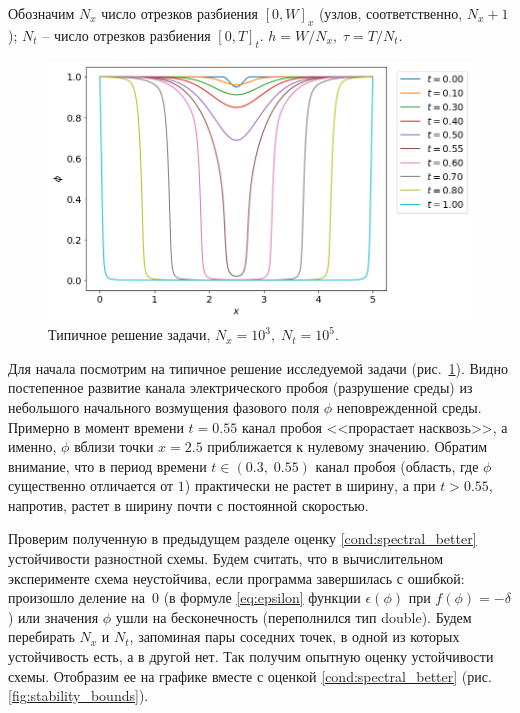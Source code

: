 Обозначим $N_x$ число отрезков разбиения $[0, W]_x$ (узлов, соответственно, $N_x + 1$); $N_t$ -- число отрезков разбиения $[0, T]_t$. $h = W / N_x, \; \tau = T / N_t$.

\begin{figure}[!tp]
	\centering
	\includegraphics[width=\textwidth]{figures/typical_solution.png}
	\vspace{-0.8cm}
	\caption{Типичное решение задачи, $N_x = 10^3, \; N_t = 10^5$.}
	\label{fig:typical_solution}
\end{figure}

Для начала посмотрим на типичное решение исследуемой задачи (рис.~\ref{fig:typical_solution}). Видно постепенное развитие канала электрического пробоя (разрушение среды) из небольшого начального возмущения фазового поля $\phi$ неповрежденной среды. Примерно в момент времени $t = 0.55$ канал пробоя <<прорастает насквозь>>, а именно, $\phi$ вблизи точки $x = 2.5$ приближается к нулевому значению. Обратим внимание, что в период времени $t \in (0.3, \; 0.55)$ канал пробоя (область, где $\phi$ существенно отличается от $1$) практически не растет в ширину, а при $t > 0.55$, напротив, растет в ширину почти с постоянной скоростью.

Проверим полученную в предыдущем разделе оценку \eqref{cond:spectral_better} устойчивости разностной схемы. Будем считать, что в вычислительном эксперименте схема неустойчива, если программа завершилась с ошибкой: произошло деление на~$0$ (в формуле \eqref{eq:epsilon} функции $\epsilon(\phi)$ при $f(\phi) = -\delta$) или значения $\phi$ ушли на бесконечность (переполнился тип double). Будем перебирать $N_x$ и $N_t$, запоминая пары соседних точек, в одной из которых устойчивость есть, а в другой нет. Так получим опытную оценку устойчивости схемы. Отобразим ее на графике вместе с оценкой \eqref{cond:spectral_better} (рис. \ref{fig:stability_bounds}).


